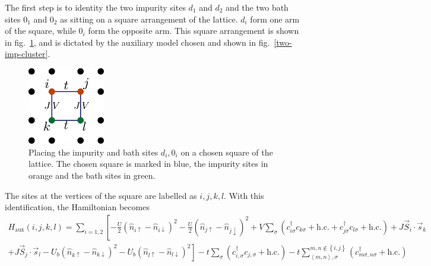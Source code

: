 \documentclass{report}
\numberwithin{equation}{section}
\begin{document}
The first step is to identity the two impurity sites \(d_1\) and \(d_2\) and the two bath sites \(0_1\) and \(0_2\) as sitting on a square arrangement of the lattice. \(d_i\) form one arm of the square, while \(0_i\) form the opposite arm.
This square arrangement is shown in fig.~\ref{square-arms}, and is dictated by the auxiliary model chosen and shown in fig.~\ref{two-imp-cluster}.
\begin{figure}[!htb]
	\centering
	\includegraphics[width=0.3\textwidth]{../figures/square_arms.pdf}
	\caption{Placing the impurity and bath sites \(d_i,0_i\) on a chosen square of the lattice. The chosen square is marked in blue, the impurity sites in orange and the bath sites in green.}
	\label{square-arms}
\end{figure}
The sites at the vertices of the square are labelled as \(i,j,k,l\). With this identification, the Hamiltonian becomes
\begin{equation}\begin{aligned}
	H_\text{aux}(i,j,k,l) = \sum_{i=1,2} \left[- \frac{U}{2}\left(\hat n_{i \uparrow} - \hat n_{i \downarrow}\right)^2 - \frac{U}{2}\left(\hat n_{j \uparrow} - \hat n_{j \downarrow}\right)^2 + V\sum_{\sigma}\left(c^\dagger_{i\sigma}c_{k\sigma} + \text{h.c.} + c^\dagger_{j\sigma}c_{l\sigma} + \text{h.c.}\right) + J \vec{S}_{i}\cdot\vec{s}_{k} \right.\\
+ \left. J \vec{S}_{j}\cdot\vec{s}_{l} - U_b\left(\hat n_{k \uparrow} - \hat n_{k \downarrow}\right)^2 - U_b\left(\hat n_{l \uparrow} - \hat n_{l \downarrow}\right)^2\right] -t \sum_\sigma \left(c^\dagger_{i,\sigma}c_{j,\sigma} + \text{h.c.}\right) -t \sum_{\left<m,n \right>, \sigma}^{m,n \notin \left\{i,j\right\}}\left(c^\dagger_{m\sigma,n\sigma} + \text{h.c.}\right) 
\end{aligned}\end{equation}
\end{document}
